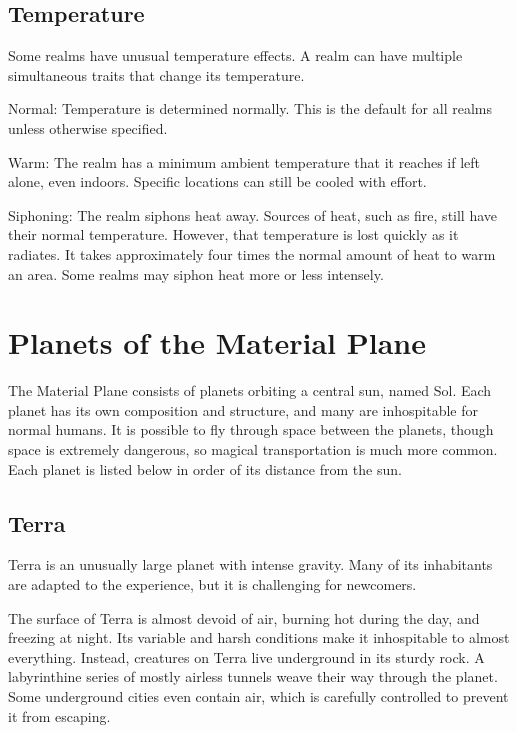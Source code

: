   \subsection{Temperature} Some realms have unusual temperature effects.
  A realm can have multiple simultaneous traits that change its temperature.
    \begin{raggeditemize}
      \item Normal: Temperature is determined normally.
        This is the default for all realms unless otherwise specified.
      \item Warm: The realm has a minimum ambient temperature that it reaches if left alone, even indoors.
         Specific locations can still be cooled with effort.
      \item Siphoning: The realm siphons heat away.
        Sources of heat, such as fire, still have their normal temperature.
        However, that temperature is lost quickly as it radiates.
        It takes approximately four times the normal amount of heat to warm an area.
        Some realms may siphon heat more or less intensely.
    \end{raggeditemize}

\section{Planets of the Material Plane}\label{Planets of the Material Plane}
  The Material Plane consists of planets orbiting a central sun, named Sol.
  Each planet has its own composition and structure, and many are inhospitable for normal humans.
  It is possible to fly through space between the planets, though space is extremely dangerous, so magical transportation is much more common.
  Each planet is listed below in order of its distance from the sun.

  \subsection{Terra}
    Terra is an unusually large planet with intense gravity.
    Many of its inhabitants are adapted to the experience, but it is challenging for newcomers.

    The surface of Terra is almost devoid of air, burning hot during the day, and freezing at night.
    Its variable and harsh conditions make it inhospitable to almost everything.
    Instead, creatures on Terra live underground in its sturdy rock.
    A labyrinthine series of mostly airless tunnels weave their way through the planet.
    Some underground cities even contain air, which is carefully controlled to prevent it from escaping.

